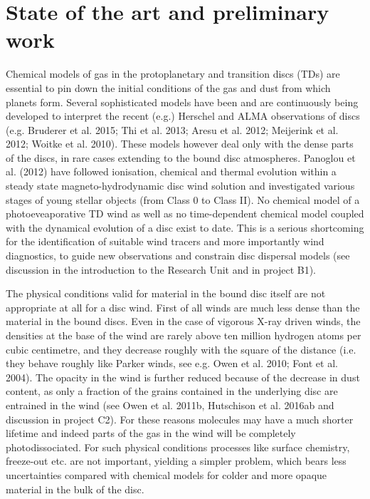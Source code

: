 \documentclass[10pt,fleqn,twoside]{article}
\newcommand{\Tcol}{\color{blue}}
\begin{document}
\section{\Tcol State of the art and preliminary work}
\renewcommand{\leftmark}{\sc State of the Art and preliminary work}

Chemical models of gas in the protoplanetary and transition discs (TDs) are essential to pin down the initial conditions of the gas and dust from which planets form. Several sophisticated models have been and are continuously being developed to interpret the recent (e.g.) Herschel and ALMA observations of discs (e.g. Bruderer et al. 2015; Thi et al. 2013; Aresu et al. 2012; Meijerink et al. 2012; Woitke et al. 2010). These models however deal only with the dense parts of the discs, in rare cases extending to the bound disc atmospheres. Panoglou et al. (2012) have followed ionisation, chemical and thermal evolution within a steady state magneto-hydrodynamic disc wind solution and investigated various stages of young stellar objects (from Class 0 to Class II).  No chemical model of a photoeveaporative TD wind as well as no time-dependent chemical model coupled with the dynamical evolution of a disc exist to date. This is a serious shortcoming for the identification of suitable wind tracers and more importantly wind diagnostics, to guide new observations and constrain disc dispersal models (see discussion in the introduction to the Research Unit and in project B1). 

The physical conditions valid for material in the bound disc itself are not appropriate at all for a disc wind. First of all winds are much less dense than the material in the bound discs. Even in the case of vigorous X-ray driven winds, the densities at the base of the wind are rarely above ten million hydrogen atoms per cubic centimetre, and they decrease roughly with the square of the distance (i.e. they behave roughly like Parker winds, see e.g. Owen et al. 2010; Font et al. 2004). The opacity in the wind is further reduced because of the decrease in dust content, as only a fraction of the grains contained in the underlying disc are entrained in the wind (see Owen et al. 2011b, Hutschison et al. 2016ab and discussion in project C2). For these reasons molecules may have a much shorter lifetime and indeed parts of the gas in the wind will be completely photodissociated. For such physical conditions processes like surface chemistry, freeze-out etc. are not important, yielding a simpler problem, which bears less uncertainties compared with chemical models for colder and more opaque material in the bulk of the disc. 
\end{document}

